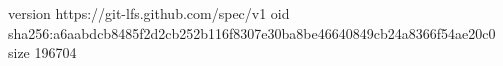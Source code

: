version https://git-lfs.github.com/spec/v1
oid sha256:a6aabdcb8485f2d2cb252b116f8307e30ba8be46640849cb24a8366f54ae20c0
size 196704
